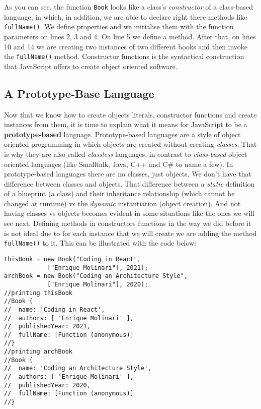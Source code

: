 \documentclass[a4paper, oneside, titlepage, 12pt]{book}
\begin{document}
As you can see, the function \texttt{Book} looks like a class's \textit{constructor} of a class-based language, in which, in addition, we are able to declare right there methods like \texttt{fullName()}. We define properties and we initialise them with the function parameters on lines 2, 3 and 4. On line 5 we define a method. After that, on lines 10 and 14 we are creating two instances of two different books and then invoke the \texttt{fullName()} method. Constructor functions is the syntactical construction that JavaScript offers to create object oriented software.

\subsection{A Prototype-Base Language}

Now that we know how to create objects literals, constructor functions and create instances from them, it is time to explain what it means for JavaScript to be a \textbf{prototype-based} language. Prototype-based languages are a style of object oriented programming in which objects are created without creating \textit{classes}. That is why they are also called \textit{classless} languages, in contrast to \textit{class-based} object oriented languages (like Smalltalk, Java, C++ and C\# to name a few). In prototype-based languages there are no classes, just objects. We don't have that difference between classes and objects. That difference between a \textit{static} definition of a blueprint (a class) and their inheritance relationship (which cannot be changed at runtime) vs the \textit{dynamic} instantiation (object creation). And not having classes vs objects becomes evident in some situations like the ones we will see next. 
Defining methods in constructors functions in the way we did before it is not ideal due to for each instance that we will create we are adding the method \texttt{fullName()} to it. This can be illustrated with the code below:

\begin{verbatim}
thisBook = new Book("Coding in React", 
			["Enrique Molinari"], 2021);
archBook = new Book("Coding an Architecture Style", 
			["Enrique Molinari"], 2020);
//printing thisBook
//Book {
//  name: 'Coding in React',
//  authors: [ 'Enrique Molinari' ],
//  publishedYear: 2021,
//  fullName: [Function (anonymous)]
//}
//printing archBook
//Book {
//  name: 'Coding an Architecture Style',
//  authors: [ 'Enrique Molinari' ],
//  publishedYear: 2020,
//  fullName: [Function (anonymous)]
//}
\end{verbatim}
\end{document}
